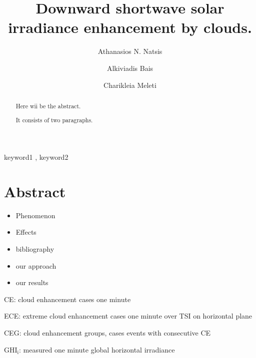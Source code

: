 \documentclass[preprint, 3p,
authoryear]{elsarticle} %
\providecommand{\tightlist}{%
  \setlength{\itemsep}{0pt}\setlength{\parskip}{0pt}}
\begin{document}
\begin{frontmatter}

  \title{Downward shortwave solar irradiance enhancement by clouds.}
    \author[LAP]{Athanasios N. Natsis%
  }
    \author[LAP]{Alkiviadis Bais%
  }
    \author[LAP]{Charikleia Meleti%
  }
  
  \begin{abstract}
  Here wii be the abstract.

  It consists of two paragraphs.
  \end{abstract}
    \begin{keyword}
    keyword1 \sep 
    keyword2
  \end{keyword}
  
 \end{frontmatter}

\hypertarget{abstract}{%
\section*{Abstract}\label{abstract}}

\begin{itemize}
\tightlist
\item
  Phenomenon
\item
  Effects
\item
  bibliography
\item
  our approach
\item
  our results
\end{itemize}

CE: cloud enhancement cases one minute

ECE: extreme cloud enhancement cases one minute over TSI on horizontal
plane

CEG: cloud enhancement groups, cases events with consecutive CE

\(\text{GHI}_\text{i}\): measured one minute global horizontal
irradiance
\end{document}

